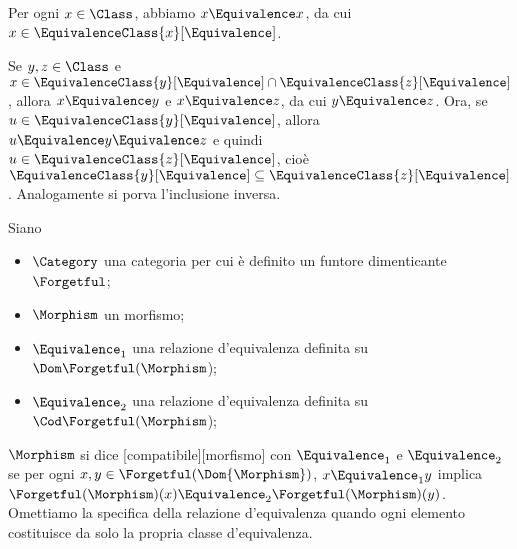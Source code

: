 \Proof Per ogni $x \in \Class$, abbiamo $x \Equivalence x$, da cui $x \in \EquivalenceClass{x}[\Equivalence]$.
\par Se $y, z \in \Class$ e $x \in \EquivalenceClass{y}[\Equivalence] \cap \EquivalenceClass{z}[\Equivalence]$, allora $x \Equivalence y$ e $x \Equivalence z$, da cui $y \Equivalence z$. Ora, se $u \in \EquivalenceClass{y}[\Equivalence]$, allora $u \Equivalence y \Equivalence z$ e quindi $u \in \EquivalenceClass{z}[\Equivalence]$, cio\`e $\EquivalenceClass{y}[\Equivalence] \subseteq \EquivalenceClass{z}[\Equivalence]$. Analogamente si porva l'inclusione inversa. \EndProof
\begin{Theorem}
	Siano
	\begin{itemize}
		\item $\Category$ una categoria per cui \`e definito un funtore
		dimenticante $\Forgetful$;
		\item $\Morphism$ un morfismo;
		\item $\Equivalence_1$ una relazione d'equivalenza definita su $\Dom \Forgetful(\Morphism$);
		\item $\Equivalence_2$ una relazione d'equivalenza definita su $\Cod \Forgetful(\Morphism$);
	\end{itemize}
	$\Morphism$ si dice [compatibile][morfismo] con $\Equivalence_1$ e $\Equivalence_2$ se per ogni $x, y \in \Forgetful(\Dom{\Morphism})$, $x \Equivalence_1 y$ implica $\Forgetful(\Morphism)(x) \Equivalence_2 \Forgetful(\Morphism)(y)$. Omettiamo la specifica della relazione d'equivalenza quando ogni elemento costituisce da solo la propria classe d'equivalenza.
\end{Theorem}
